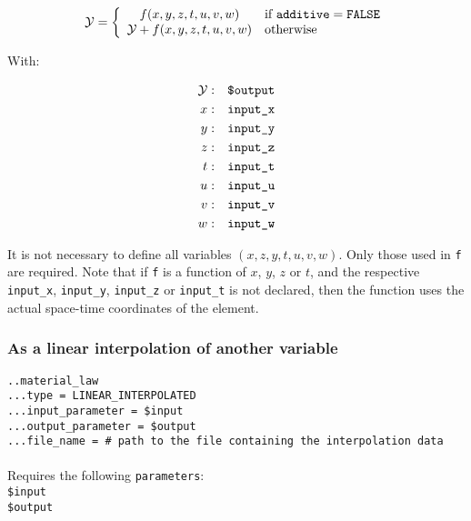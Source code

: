 \documentclass[10pt]{article}
\begin{document}
\begin{equation}
	\mathcal{Y} = \left\{ \begin{array}{cl} f(x,y,z,t,u,v,w) & \text{if }\verb+additive+ = \verb+FALSE+  \\ \mathcal{Y} +f(x,y,z,t,u,v,w) & \text{otherwise} \end{array} \right.
\end{equation}

With:

\begin{eqnarray}
	\mathcal{Y} & : & \verb+$output+ \notag \\
	x & : & \verb+input_x+ \notag \\
	y & : & \verb+input_y+ \notag \\
	z & : & \verb+input_z+ \notag \\
	t & : & \verb+input_t+ \notag \\
	u & : & \verb+input_u+ \notag \\
	v & : & \verb+input_v+ \notag \\
	w & : & \verb+input_w+ \notag 
\end{eqnarray}

It is not necessary to define all variables $(x,z,y,t,u,v,w)$. Only those used in \verb+f+ are required. Note that if \verb+f+ is a function of $x$, $y$, $z$ or $t$, and the respective \verb+input_x+, \verb+input_y+, \verb+input_z+ or \verb+input_t+ is not declared, then the function uses the actual space-time coordinates of the element.

\subsubsection{As a linear interpolation of another variable}

\noindent \verb+..material_law+\\
\verb+...type = LINEAR_INTERPOLATED+\\
\verb+...input_parameter = $input+\\
\verb+...output_parameter = $output+\\
\verb+...file_name = # path to the file containing the interpolation data+

\paragraph{}Requires the following \verb+parameters+:\\

\noindent \verb+$input+\\
\verb+$output+
\end{document}
